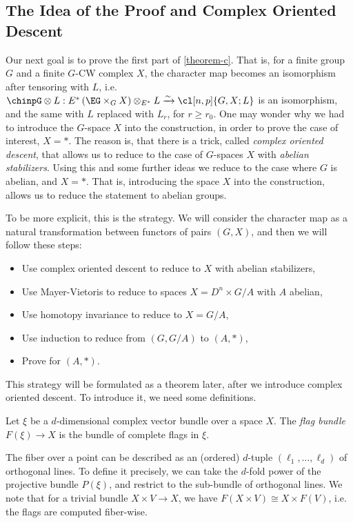 \subsection{The Idea of the Proof and Complex Oriented Descent}

Our next goal is to prove the first part of \ref{theorem-c}.
That is, for a finite group $G$ and a finite $G$-CW complex $X$, the character map becomes an isomorphism after tensoring with $L$, i.e.
$\chinpG \otimes L: E^*\left(\EG \times_G X\right) \otimes_{E^*} L \xrightarrow{\sim} \cl[n,p]{G,X; L}$
is an isomorphism, and the same with $L$ replaced with $L_r$, for $r \geq r_0$.
One may wonder why we had to introduce the $G$-space $X$ into the construction, in order to prove the case of interest, $X = *$.
The reason is, that there is a trick, called \emph{complex oriented descent}, that allows us to reduce to the case of $G$-spaces $X$ with \emph{abelian stabilizers}.
Using this and some further ideas we reduce to the case where $G$ is abelian, and $X = *$.
That is, introducing the space $X$ into the construction, allows us to reduce the statement to abelian groups.

To be more explicit, this is the strategy.
We will consider the character map as a natural transformation between functors of pairs $\left(G, X\right)$, and then we will follow these steps:
\begin{itemize}
	\item Use complex oriented descent to reduce to $X$ with abelian stabilizers,
	\item Use Mayer-Vietoris to reduce to spaces $X = D^n \times G/A$ with $A$ abelian,
	\item Use homotopy invariance to reduce to $X = G/A$,
	\item Use induction to reduce from $\left(G, G/A\right)$ to $\left(A, *\right)$,
	\item Prove for $\left(A, *\right)$.
\end{itemize}

This strategy will be formulated as a theorem later, after we introduce complex oriented descent.
To introduce it, we need some definitions.

\begin{definition}
	Let $\xi$ be a $d$-dimensional complex vector bundle over a space $X$.
	The \emph{flag bundle} $F\left(\xi\right) \to X$ is the bundle of complete flags in $\xi$.
\end{definition}

The fiber over a point can be described as an (ordered) $d$-tuple $\left(\ell_1, \dotsc, \ell_d\right)$ of orthogonal lines.
To define it precisely, we can take the $d$-fold power of the projective bundle $P\left(\xi\right)$, and restrict to the sub-bundle of orthogonal lines.
We note that for a trivial bundle $X \times V \to X$, we have $F\left(X \times V\right) \cong X \times F\left(V\right)$, i.e. the flags are computed fiber-wise.

